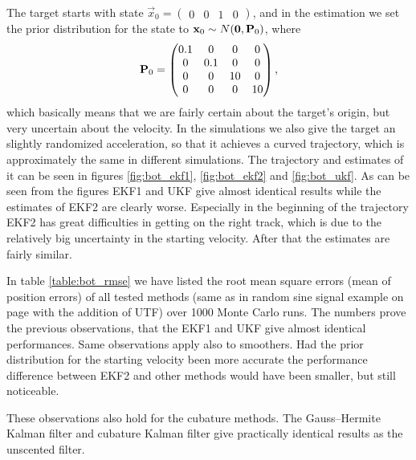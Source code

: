 The target starts with state $\vec{x}_0 = \begin{pmatrix} 0 & 0 & 1 &
0
\end{pmatrix}$, and in the estimation we set the prior distribution
for the state to $\mathbf{x}_0 \sim N(\mathbf{0},\mathbf{P}_0)$, where
%
\begin{equation}
%
\mat{P}_0 = \begin{pmatrix} 0.1 & 0 & 0 & 0\\ 0 & 0.1 & 0 & 0\\ 0 & 0
& 10 & 0\\ 0 & 0 & 0 & 10
\end{pmatrix},
%
\end{equation}
%
which basically means that we are fairly certain about the target's
origin, but very uncertain about the velocity. In the simulations we
also give the target an slightly randomized acceleration, so that it
achieves a curved trajectory, which is approximately the same in
different simulations. The trajectory and estimates of it can be seen
in figures \ref{fig:bot_ekf1}, \ref{fig:bot_ekf2} and
\ref{fig:bot_ukf}. As can be seen from the figures EKF1 and UKF give
almost identical results while the estimates of EKF2 are clearly
worse. Especially in the beginning of the trajectory EKF2 has great
difficulties in getting on the right track, which is due to the
relatively big uncertainty in the starting velocity. After that the
estimates are fairly similar.

In table \ref{table:bot_rmse} we have listed the root mean square
errors (mean of position errors) of all tested methods (same as in
random sine signal example on page \pageref{page:sine_rmse} with the
addition of UTF) over 1000 Monte Carlo runs. The numbers prove the
previous observations, that the EKF1 and UKF give almost identical
performances. Same observations apply also to smoothers. Had the prior
distribution for the starting velocity been more accurate the
performance difference between EKF2 and other methods would have been
smaller, but still noticeable.

These observations also hold for the cubature methods. The Gauss--Hermite
Kalman filter and cubature Kalman filter give practically identical 
results as the unscented filter.

